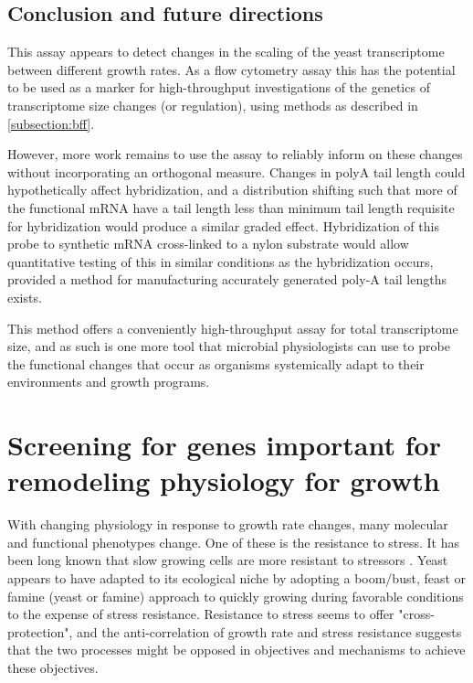 \subsection{Conclusion and future directions}

This assay appears to detect changes in the scaling of the yeast
transcriptome between different growth rates. As a flow cytometry 
assay this has the potential to be used as a marker for
high-throughput investigations of the genetics of transcriptome size
changes (or regulation), using methods as described in
\autoref{subsection:bff}. 

However, more work remains to use the assay to reliably inform on
these changes without incorporating an orthogonal measure.
Changes in polyA tail length could hypothetically affect
hybridization, and a distribution shifting such that more of the
functional mRNA have a tail length less than minimum tail length
requisite for hybridization would produce a similar graded effect.
Hybridization of this probe to synthetic mRNA cross-linked to a nylon
substrate would allow quantitative testing of this in similar
conditions as the hybridization occurs, provided a method for
manufacturing accurately generated poly-A tail lengths exists.

This method offers a conveniently high-throughput assay for total
transcriptome size, and as such is one more tool that microbial
physiologists can use to probe the functional changes that occur as
organisms systemically adapt to their environments and growth
programs.

\section{Screening for genes important for remodeling physiology for
growth}

With changing physiology in response to growth rate changes, many
molecular and functional phenotypes change. One of these is the
resistance to stress. 
It has been long known that slow growing cells are more resistant to
stressors \parencite{??}.
Yeast appears to have adapted to its ecological niche by adopting a
boom/bust, feast or famine (yeast or famine) approach to quickly
growing during favorable conditions to the expense of stress
resistance. 
Resistance to stress seems to offer "cross-protection", and the
anti-correlation of growth rate and stress resistance suggests that
the two processes might be opposed in objectives and mechanisms to
achieve these objectives.

